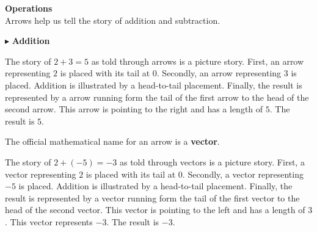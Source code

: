 \documentclass{ximera}
\begin{document}
\textbf{\textcolor{red!25!blue!75!}{Operations}} \\


Arrows help us tell the story of addition and subtraction.



$\blacktriangleright$ \textbf{Addition}


The story of $2+3=5$ as told through arrows is a picture story.  First, an arrow representing $2$ is placed with its tail at $0$.  Secondly, an arrow representing $3$ is placed.  Addition is illustrated by a head-to-tail placement.  Finally, the result is represented by a arrow running form the tail of the first arrow to the head of the second arrow. This arrow is pointing to the right and has a length of $5$.  The result is $5$.




  \begin{image}
  \end{image}





The official mathematical name for an arrow is a \textbf{\textcolor{purple!85!blue}{vector}}.









The story of $2+(-5)=-3$ as told through vectors is a picture story.  First, a vector representing $2$ is placed with its tail at $0$.  Secondly, a vector representing $-5$ is placed.  Addition is illustrated by a head-to-tail placement.  Finally, the result is represented by a vector running form the tail of the first vector to the head of the second vector. This vector is pointing to the left and has a length of $3$.  This vector represents $-3$. The result is $-3$.
\end{document}
